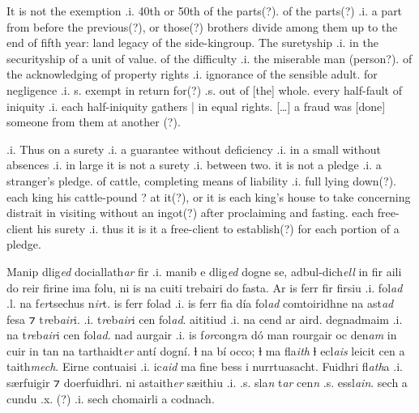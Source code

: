 \documentclass[11pt]{article}
\begin{document}
\begin{pages}
\begin{Rightside}
    \pstart
    It is not the exemption .i. 40th or 50th of the parts(?). of the parts(?) .i. a part from before the previous(?), or those(?) brothers divide among them up to the end of fifth year: land legacy of the side-kingroup. The suretyship .i. in the securityship of a unit of value.  of the difficulty .i. the miserable man (person?). of the acknowledging of property rights .i. ignorance of the sensible adult. for negligence .i. s. exempt in return for(?) .s. out of [the] whole. every half-fault of iniquity .i. each half-iniquity gathers | in equal rights. [\ldots{}]  a fraud was [done] someone from them at another (?). 
    \pend
  
    \pstart
    [\ldots{}?] .i. Thus on a surety .i. a guarantee without deficiency .i. in a small without absences .i. in large it is not a surety .i. between two.  it is not a pledge .i. a stranger's pledge.  of cattle, completing means of liability .i. full lying down(?).  each king his cattle-pound ? at it(?), or it is each king's house to take concerning distrait in visiting without an ingot(?) after proclaiming and fasting.  each free-client his surety .i. thus it is it a free-client to establish(?) for each portion of a pledge.

    \pend
  \endnumbering
  \end{Rightside}
  \Pages
 
  \begin{Leftside}
    \beginnumbering
   \pstart 
    Manip dlig\emph{ed} dociallath\emph{ar}  fir .i. manib e dlig\emph{ed} dogne se, adbul-dich\emph{ell} in fir aili do reir firine ima folu, ni is  na cuiti trebairi do fasta.  Ar is ferr fir firsiu .i. fol\emph{ad} .l. na f\emph{er}tsechus n\emph{ir}t.  is ferr folad .i. is ferr fia d\'{i}a fol\emph{ad} comtoiridhne na ast\emph{ad} fesa ⁊ t\emph{r}eb\emph{air}i.   .i. t\emph{r}eb\emph{air}i cen fol\emph{ad}.  aititiud .i. na cend ar aird.  degnadmaim .i. na t\emph{re}b\emph{air}i cen fol\emph{ad}.   nad aurgair .i. is f\emph{or}cong\emph{r}a d\'{o} man rourgair oc den\emph{am} in cuir in tan na tarthaidt\emph{er} ant\'{i} dogn\'{i}.  ɫ na b\'{i} occo; ɫ ma fla\emph{ith} ɫ ecl\emph{ais} leicit cen a taith\emph{mech}.  Eirne contuaisi .i. ic\emph{aid} ma fine bess i nurrtuasacht.  Fuidhri fl\emph{ath}a .i. særfuigir ⁊ doerfuidhri.  ni astaith\emph{er} sæithiu .i. .s. sla\emph{n} t\emph{ar} cen\emph{n} .s. essl\emph{ain}.  sech a cundu .x. (?) .i. sech chomairli a codnach. 
    \pend
  

\end{Leftside}
\end{pages}
\end{document}
